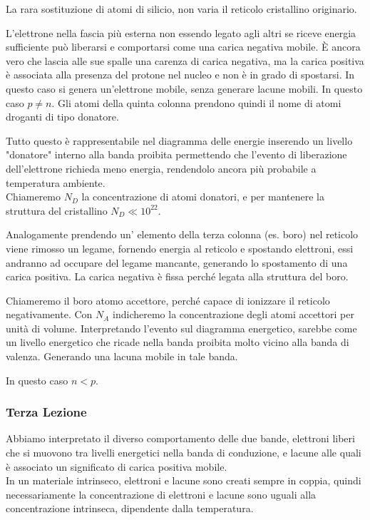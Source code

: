 \documentclass[../template]{subfiles}
\begin{document}
La rara sostituzione di atomi di silicio, non varia il reticolo cristallino originario.

L'elettrone nella fascia più esterna non essendo legato agli altri se riceve energia sufficiente può liberarsi e comportarsi come una carica negativa mobile. È ancora vero che lascia alle sue spalle una carenza di carica negativa, ma la carica positiva è associata alla presenza del protone nel nucleo e non è in grado di spostarsi.
In questo caso si genera un'elettrone mobile, senza generare lacune mobili. In questo caso $p \neq n$. Gli atomi della quinta colonna prendono quindi il nome di atomi droganti di tipo donatore.

Tutto questo è rappresentabile nel diagramma delle energie inserendo un livello "donatore" interno alla banda proibita permettendo che l'evento di liberazione dell'elettrone richieda meno energia, rendendolo ancora più probabile a temperatura ambiente.
\\
Chiameremo $N_D$ la concentrazione di atomi donatori, e per mantenere la struttura del cristallino $N_D \ll 10^{22}$.

Analogamente prendendo un' elemento della terza colonna (es. boro) nel reticolo viene rimosso un legame, fornendo energia al reticolo e spostando elettroni, essi andranno ad occupare del legame mancante, generando lo spostamento di una carica positiva.
La carica negativa è fissa perché legata alla struttura del boro.

Chiameremo il boro atomo accettore, perché capace di ionizzare il reticolo negativamente. Con $N_A$ indicheremo la concentrazione degli atomi accettori per unità di volume. Interpretando l'evento sul diagramma energetico, sarebbe come un livello energetico che ricade nella banda proibita molto vicino alla banda di valenza. Generando una lacuna mobile in tale banda.

In questo caso $n < p$.

\subsubsection{Terza Lezione}
Abbiamo interpretato il diverso comportamento delle due bande, elettroni liberi che si muovono tra livelli energetici nella banda di conduzione, e lacune alle quali è associato un significato di carica positiva mobile.
\\
In un materiale intrinseco, elettroni e lacune sono creati sempre in coppia, quindi necessariamente la concentrazione di elettroni e lacune sono uguali alla concentrazione intrinseca, dipendente dalla temperatura.
\end{document}

